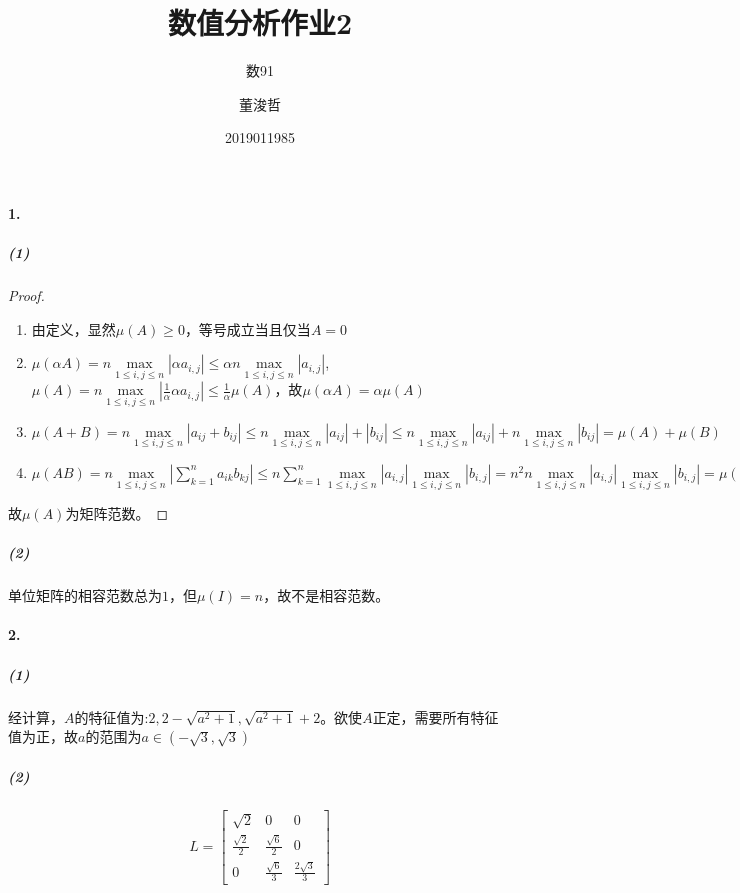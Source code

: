\documentclass{ctexart}
\title{数值分析作业2}
\author{数91\and 董浚哲\and 2019011985}
\begin{document}
\maketitle
\newcommand{\R}{\mathbf{R}}
\newcommand{\dd}{\,\mathrm{d}}
\newcommand{\st}{\text{ s.t. }}
\newcommand{\pp}[2]{\frac{\partial #1}{\partial #2}}
\newcommand{\nm}[1]{\left\|#1\right\|}

\paragraph{1.}
\subparagraph{(1)}
\begin{proof}
\begin{enumerate}
\item 由定义，显然$\mu(A)\geq 0$，等号成立当且仅当$A=0$
\item $\mu(\alpha A)=n\max\limits_{1\leq i,j\leq n}|\alpha a_{i,j}|\leq \alpha n\max\limits_{1\leq i,j\leq n}| a_{i,j}|$, $\mu(A)=n\max\limits_{1\leq i,j\leq n}|\frac{1}{\alpha}\alpha a_{i,j}|\leq \frac{1}{\alpha}\mu(A)$，故$\mu(\alpha A)=\alpha\mu(A)$
\item $\mu(A+B)=n\max\limits_{1\leq i,j\leq n}|a_{ij}+b_{ij}|\leq n\max\limits_{1\leq i,j\leq n}|a_{ij}|+|b_{ij}|\leq n\max\limits_{1\leq i,j\leq n}|a_{ij}|+n\max\limits_{1\leq i,j\leq n}|b_{ij}|=\mu(A)+\mu(B)$
\item $\mu(AB)=n\max\limits_{1\leq i,j\leq n}|\sum\limits_{k=1}^na_{ik}b_{kj}|\leq n \sum_{k=1}^n\max\limits_{1\leq i,j\leq n}|a_{i,j}|\max\limits_{1\leq i,j\leq n}|b_{i,j}|=n^2n\max\limits_{1\leq i,j\leq n}|a_{i,j}|\max\limits_{1\leq i,j\leq n}|b_{i,j}|=\mu(A)\mu(B)$
\end{enumerate}
故$\mu(A)$为矩阵范数。
\end{proof}

\subparagraph{(2)}
单位矩阵的相容范数总为$1$，但$\mu(I)=n$，故不是相容范数。

\paragraph{2.}
\subparagraph{(1)}
经计算，$A$的特征值为:$2,2-\sqrt{a^2+1},\sqrt{a^2 + 1}+2$。欲使$A$正定，需要所有特征值为正，故$a$的范围为$a\in (-\sqrt{3},\sqrt{3})$
\subparagraph{(2)}
\[L=\begin{bmatrix}
\sqrt{2}&0&0\\
\frac{\sqrt{2}}{2}&\frac{\sqrt{6}}{2}&0\\
0&\frac{\sqrt{6}}{3}&\frac{2\sqrt{3}}{3}
\end{bmatrix}\]
\end{document}
